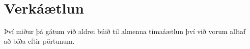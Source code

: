 \section{Verkáætlun}
Því miður þá gátum við aldrei búið til almenna tímaáætlun því við vorum alltaf að bíða eftir pörtunum.
